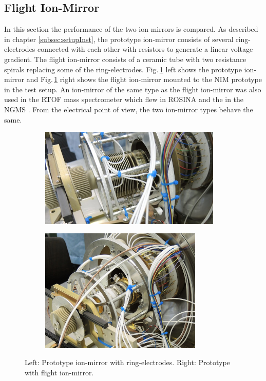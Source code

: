 	\subsection{Flight Ion-Mirror}
	In this section the performance of the two ion-mirrors is compared. As described in chapter \ref{subsec:setupInst}, the prototype ion-mirror consists of several ring-electrodes connected with each other with resistors to generate a linear voltage gradient. The flight ion-mirror consists of a ceramic tube with two resistance spirals replacing some of the ring-electrodes. Fig.\,\ref{fig:ExpRefl} left shows the prototype ion-mirror and Fig.\,\ref{fig:ExpRefl} right shows the flight ion-mirror mounted to the NIM prototype in the test setup. An ion-mirror of the same type as the flight ion-mirror was also used in the RTOF mass spectrometer which flew in ROSINA \cite{Diss_Scherer} and the in the NGMS \cite{Diss_Hofer}. From the electrical point of view, the two ion-mirror types behave the same.\\
	\begin{figure}[h]
		\begin{subfigure}{0.5\textwidth}
			\centering
			\includegraphics[width = 0.95\textwidth]{Experiments/reflectron_Prototype1.jpg}
		\end{subfigure}
		\begin{subfigure}{0.5\textwidth}
			\centering
			\includegraphics[width = 0.85\textwidth]{Experiments/reflectron_flight.JPG}
		\end{subfigure}
		\caption{Left: Prototype ion-mirror with ring-electrodes. Right: Prototype with flight ion-mirror.}
		\label{fig:ExpRefl}
	\end{figure}
